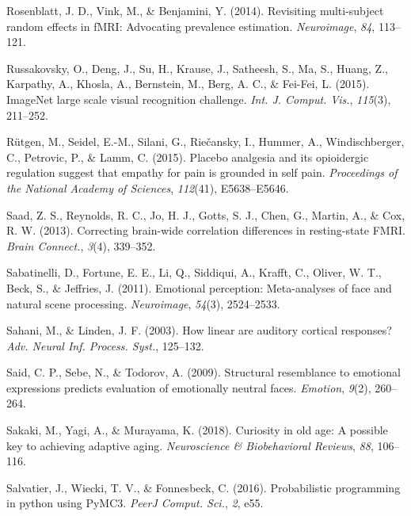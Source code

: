 \documentclass[11pt,american,a4paper,oneside,]{memoir} %
\begin{document}
\leavevmode\hypertarget{ref-Rosenblatt2014-az}{}%
Rosenblatt, J. D., Vink, M., \& Benjamini, Y. (2014). Revisiting multi-subject random effects in fMRI: Advocating prevalence estimation. \emph{Neuroimage}, \emph{84}, 113--121.

\leavevmode\hypertarget{ref-Russakovsky2015-oo}{}%
Russakovsky, O., Deng, J., Su, H., Krause, J., Satheesh, S., Ma, S., Huang, Z., Karpathy, A., Khosla, A., Bernstein, M., Berg, A. C., \& Fei-Fei, L. (2015). ImageNet large scale visual recognition challenge. \emph{Int. J. Comput. Vis.}, \emph{115}(3), 211--252.

\leavevmode\hypertarget{ref-rutgen2015placebo}{}%
Rütgen, M., Seidel, E.-M., Silani, G., Riečansky, I., Hummer, A., Windischberger, C., Petrovic, P., \& Lamm, C. (2015). Placebo analgesia and its opioidergic regulation suggest that empathy for pain is grounded in self pain. \emph{Proceedings of the National Academy of Sciences}, \emph{112}(41), E5638--E5646.

\leavevmode\hypertarget{ref-Saad2013-zd}{}%
Saad, Z. S., Reynolds, R. C., Jo, H. J., Gotts, S. J., Chen, G., Martin, A., \& Cox, R. W. (2013). Correcting brain-wide correlation differences in resting-state FMRI. \emph{Brain Connect.}, \emph{3}(4), 339--352.

\leavevmode\hypertarget{ref-sabatinelli2011emotional}{}%
Sabatinelli, D., Fortune, E. E., Li, Q., Siddiqui, A., Krafft, C., Oliver, W. T., Beck, S., \& Jeffries, J. (2011). Emotional perception: Meta-analyses of face and natural scene processing. \emph{Neuroimage}, \emph{54}(3), 2524--2533.

\leavevmode\hypertarget{ref-Sahani2003-kk}{}%
Sahani, M., \& Linden, J. F. (2003). How linear are auditory cortical responses? \emph{Adv. Neural Inf. Process. Syst.}, 125--132.

\leavevmode\hypertarget{ref-Said2009-tf}{}%
Said, C. P., Sebe, N., \& Todorov, A. (2009). Structural resemblance to emotional expressions predicts evaluation of emotionally neutral faces. \emph{Emotion}, \emph{9}(2), 260--264.

\leavevmode\hypertarget{ref-sakaki2018curiosity}{}%
Sakaki, M., Yagi, A., \& Murayama, K. (2018). Curiosity in old age: A possible key to achieving adaptive aging. \emph{Neuroscience \& Biobehavioral Reviews}, \emph{88}, 106--116.

\leavevmode\hypertarget{ref-Salvatier2016-ko}{}%
Salvatier, J., Wiecki, T. V., \& Fonnesbeck, C. (2016). Probabilistic programming in python using PyMC3. \emph{PeerJ Comput. Sci.}, \emph{2}, e55.
\end{document}
